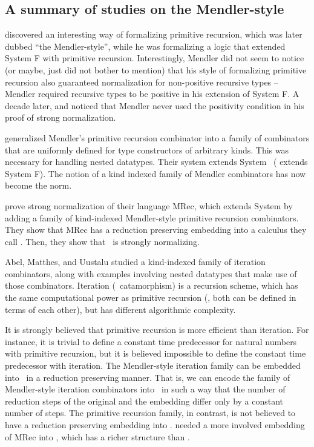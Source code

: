 \subsection{A summary of studies on the Mendler-style}
\label{sec:relwork:bg}

\citet{Mendler87} discovered an interesting way of formalizing
primitive recursion, which was later dubbed ``the Mendler-style'',
while he was formalizing a logic that extended System \textsf{F} with
primitive recursion. Interestingly, Mendler did not seem to notice
(or maybe, just did not bother to mention) that his style of formalizing
primitive recursion also guaranteed normalization for non-positive recursive
types -- Mendler required recursive types to be positive in his extension of
System \textsf{F}. A decade later, \citet{matthes98phd} and \citet{uustalu98phd}
noticed that Mendler never used the positivity condition in his proof of
strong normalization.

\citet{AbeMat04} generalized Mendler's primitive recursion combinator
\cite{Mendler87} into a family of combinators that are uniformly defined for
type constructors of arbitrary kinds. This was necessary for
handling nested datatypes. Their system extends System \Fw\ 
(\citet{Mendler87} extends System \textsf{F}). The notion
of a kind indexed family of Mendler combinators has now become the norm.

\citet{AbeMat04} prove strong normalization of their language \textsf{MRec},
which extends System \Fw by adding a family of kind-indexed Mendler-style
primitive recursion combinators. They show that \textsf{MRec} has
a reduction preserving embedding into a calculus they call \Fixw.
Then, they show that \Fixw\ is strongly normalizing.

Abel, Matthes, and Uustalu \cite{AbeMatUus03,AbeMatUus05} studied
a kind-indexed family of iteration combinators, along with examples
involving nested datatypes that make use of those combinators.
Iteration (\aka\ catamorphism) is a recursion scheme, which has the same
computational power as primitive recursion (\ie, both can be defined
in terms of each other), but has different algorithmic complexity. 

It is strongly believed that primitive recursion is more efficient than
iteration. For instance, it is trivial to define a constant time predecessor
for natural numbers with primitive recursion, but it is believed impossible
to define the constant time predecessor with iteration. The Mendler-style
iteration family can be embedded into \Fw\ in a reduction preserving manner.
That is, we can encode the family of Mendler-style iteration combinators
into \Fw\ in such a way that the number of reduction steps of the original
and the embedding differ only by a constant number of steps. The primitive
recursion family, in contrast, is not believed to have a reduction preserving
embedding into \Fw. \citet{AbeMat04} needed a more involved embedding of
\textsf{MRec} into \Fixw, which has a richer structure than \Fw.


